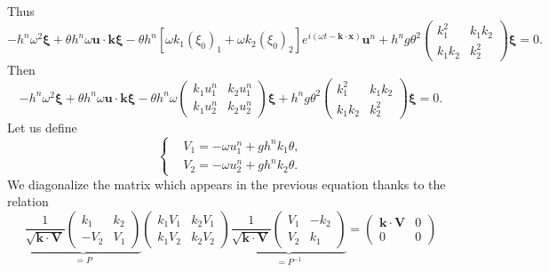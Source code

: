 \documentclass[a4paper, 11pt]{report}
\begin{document}
Thus
\begin{equation*}
-h^n\omega^2\boldsymbol{\xi}+\theta h^n\omega \boldsymbol{u}\cdot \boldsymbol{k}\boldsymbol{\xi}-\theta h^n\left[\omega k_1(\xi_0)_1+\omega k_2(\xi_0)_2\right]e^{i(\omega t-\boldsymbol{k}\cdot \boldsymbol{x})}\boldsymbol{u}^n+h^ng\theta^2\begin{pmatrix}k_1^2&k_1k_2\\k_1k_2&k_2^2\end{pmatrix} \boldsymbol{\xi}=0.
\end{equation*}
Then
\begin{equation*}
-h^n\omega^2\boldsymbol{\xi}+\theta h^n\omega \boldsymbol{u}\cdot \boldsymbol{k}\boldsymbol{\xi}-\theta h^n\omega \begin{pmatrix}k_1u_1^n&k_2u_1^n\\ k_1u_2^n&k_2u_2^n\end{pmatrix}\boldsymbol{\xi}+h^ng\theta^2\begin{pmatrix}k_1^2&k_1k_2\\k_1k_2&k_2^2\end{pmatrix} \boldsymbol{\xi}=0.
\end{equation*}
Let us define 
\begin{equation*}
\left\{\begin{split}
&V_1=-\omega u_1^n+gh^nk_1\theta,\\
&V_2=-\omega u_2^n+gh^nk_2\theta.
\end{split}\right.
\end{equation*}
We diagonalize the matrix which appears in the previous equation thanks to the relation
\begin{equation*}
\underbrace{\frac{1}{\sqrt{\boldsymbol{k}\cdot \boldsymbol{V}}}\begin{pmatrix}
k_1&k_2\\
-V_2&V_1
\end{pmatrix}}_{=P}
\begin{pmatrix}
k_1V_1&k_2V_1\\
k_1V_2&k_2V_2
\end{pmatrix}
\underbrace{\frac{1}{\sqrt{\boldsymbol{k}\cdot \boldsymbol{V}}}\begin{pmatrix}
V_1&-k_2\\
V_2&k_1
\end{pmatrix}}_{=P^{-1}}
=\begin{pmatrix}
\boldsymbol{k}\cdot \boldsymbol{V}&0\\0&0
\end{pmatrix}
\end{equation*}
\end{document}
